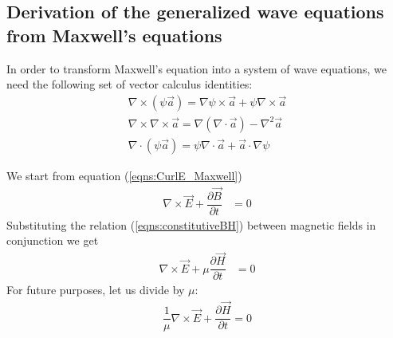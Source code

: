 \documentclass[12pt,twoside]{report}
\begin{document}
\begin{appendices}
\chapter{Derivation of the generalized wave equations from Maxwell's equations}
\label{append:GeneralizedWaveDeriv}
In order to transform Maxwell's equation into a system of wave equations, we need the following set of vector calculus identities:
\begin{subequations}
\label{eqns:vectorCalcIDs}
	\begin{align}
			\nabla \times (\psi \overrightarrow{a}) = \nabla \psi \times 	
			\overrightarrow{a} + \psi \nabla \times \overrightarrow{a}  \label{eqns:ProdCurlID}\\
		\nabla \times \nabla \times \overrightarrow{a} = \nabla ( \nabla
			 \cdot \overrightarrow{a} ) - \nabla^2\overrightarrow{a} \label{eqns:CurlCurlID}\\
		\nabla \cdot (\psi \overrightarrow{a}) = \psi \nabla \cdot \overrightarrow{a}
			 + \overrightarrow{a} \cdot \nabla \psi \label{eqns:DivProdID}
			\end{align}
\end{subequations}

We start from equation (\ref{eqns:CurlE_Maxwell})
\begin{align*}
\nabla \times \overrightarrow{E} + \dfrac{\partial \overrightarrow{B}}{\partial t}&= 0
\end{align*}
Substituting the relation (\ref{eqns:constitutiveBH}) between magnetic fields in conjunction we get
\begin{align*}
\nabla \times \overrightarrow{E} + \mu \dfrac{\partial  \overrightarrow{H}}{\partial t}&= 0
\end{align*}
For future purposes, let us divide by $\mu$:
\begin{align*}
\dfrac{1}{\mu} \nabla \times \overrightarrow{E} + \dfrac{\partial \overrightarrow{H}}{\partial t} = 0
\end{align*}


\end{appendices}
\end{document}

